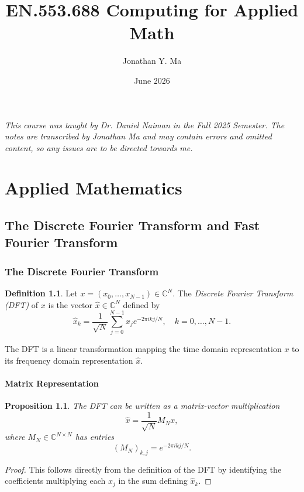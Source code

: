 \documentclass[12pt,oneside]{book}
\title{EN.553.688 Computing for Applied Math}
\author{Jonathan Y. Ma}
\date{June 2026}
\numberwithin{equation}{section}
\theoremstyle{definition}
\newtheorem{definition}{Definition}[section]
\theoremstyle{plain}
\newtheorem{proposition}{Proposition}[section]
\theoremstyle{remark}
\newcommand{\C}{\mathbb{C}}
\begin{document}
\maketitle

\noindent \emph{This course was taught by Dr. Daniel Naiman in the Fall 2025 Semester. The notes are transcribed by Jonathan Ma and may contain errors and omitted content, so any issues are to be directed towards me.}

\tableofcontents

\part{Applied Mathematics}

\chapter{The Discrete Fourier Transform and Fast Fourier Transform}

\section{The Discrete Fourier Transform}

\begin{definition}
Let $x = (x_0, \ldots, x_{N-1}) \in \C^N$. The \emph{Discrete Fourier Transform (DFT)} of $x$ is the vector $\hat{x} \in \C^N$ defined by
\[
\hat{x}_k = \frac{1}{\sqrt{N}} \sum_{j=0}^{N-1} x_j e^{-2\pi i k j / N}, \quad k = 0, \ldots, N-1.
\]
\end{definition}

The DFT is a linear transformation mapping the time domain representation $x$ to its frequency domain representation $\hat{x}$.

\subsection{Matrix Representation}

\begin{proposition}
The DFT can be written as a matrix-vector multiplication
\[
\hat{x} = \frac{1}{\sqrt{N}} M_N x,
\]
where $M_N \in \C^{N \times N}$ has entries
\[
(M_N)_{k,j} = e^{-2\pi i k j / N}.
\]
\end{proposition}

\begin{proof}
This follows directly from the definition of the DFT by identifying the coefficients multiplying each $x_j$ in the sum defining $\hat{x}_k$.
\end{proof}
\end{document}
